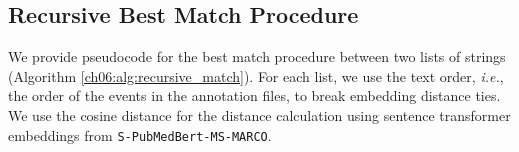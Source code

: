 \subsection{Recursive Best Match Procedure}
\label{ch06:apd:pseudo}
We provide pseudocode for the best match procedure between two lists of strings (Algorithm \ref{ch06:alg:recursive_match}).
For each list, we use the text order, \emph{i.e.}, the order of the events in the annotation files, to break embedding distance ties.
We use the cosine distance for the distance calculation using sentence transformer embeddings from \texttt{S-PubMedBert-MS-MARCO}.









\FloatBarrier
